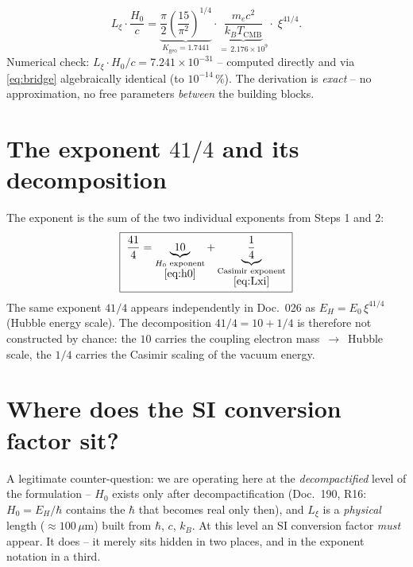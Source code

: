 \begin{keyresult}
\begin{equation}
  L_\xi\cdot\frac{H_0}{c}
  = \underbrace{\frac{\pi}{2}\left(\frac{15}{\pi^2}\right)^{1/4}}_{K_\text{geo}=1.7441}
  \cdot
  \underbrace{\frac{m_ec^2}{k_BT_\text{CMB}}}_{=\,2.176\times10^{9}}
  \cdot\;\xi^{41/4}.
  \label{eq:bridge}
\end{equation}
Numerical check: $L_\xi\cdot H_0/c = 7.241\times10^{-31}$ -- computed directly
and via \eqref{eq:bridge} algebraically identical (to $10^{-14}\,\%$). The
derivation is \emph{exact} -- no approximation, no free parameters
\emph{between} the building blocks.
\end{keyresult}

\section{The exponent $41/4$ and its decomposition}

The exponent is the sum of the two individual exponents from Steps 1 and 2:
\begin{equation}
  \boxed{\;\frac{41}{4}
  = \underbrace{10}_{\substack{H_0\text{ exponent}\\ \eqref{eq:h0}}}
  + \underbrace{\frac14}_{\substack{\text{Casimir exponent}\\ \eqref{eq:Lxi}}}\;}
  \label{eq:decomp}
\end{equation}
The same exponent $41/4$ appears independently in Doc.~026 as
$E_H = E_0\,\xi^{41/4}$ (Hubble energy scale). The decomposition $41/4=10+1/4$ is
therefore not constructed by chance: the $10$ carries the coupling electron
mass~$\to$~Hubble scale, the $1/4$ carries the Casimir scaling of the vacuum
energy.

\section{Where does the SI conversion factor sit?}

A legitimate counter-question: we are operating here at the
\emph{decompactified} level of the formulation -- $H_0$ exists only after
decompactification (Doc.~190, R16: $H_0 = E_H/\hbar$ contains the $\hbar$ that
becomes real only then), and $L_\xi$ is a \emph{physical} length ($\approx
100\,\mu$m) built from $\hbar$, $c$, $k_B$. At this level an SI conversion
factor \emph{must} appear. It does -- it merely sits hidden in two places, and
in the exponent notation in a third.

